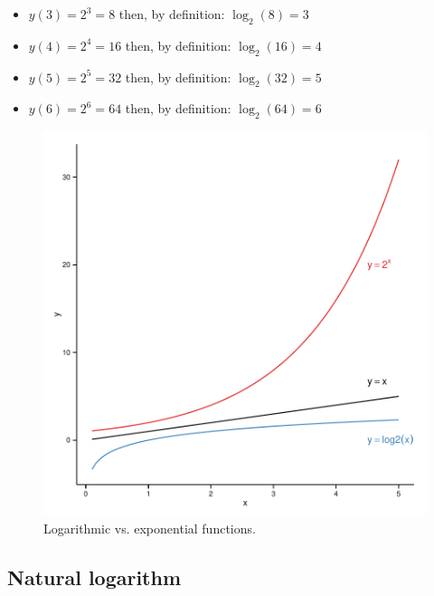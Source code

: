 \begin{itemize}
  \item $y(3) = 2^3 = 8$ \quad then, by definition: \quad $\log_2(8) = 3$
  \item $y(4) = 2^4 = 16$ \quad then, by definition: \quad $\log_2(16) = 4$
  \item $y(5) = 2^5 = 32$ \quad then, by definition: \quad $\log_2(32) = 5$
  \item $y(6) = 2^6 = 64$ \quad then, by definition: \quad $\log_2(64) = 6$
\end{itemize}

\begin{knitrout}
\color{fgcolor}\begin{figure}[]

\includegraphics[width=\linewidth]{images/math-fun_explog} \caption{Logarithmic vs. exponential functions.\label{fig:fun_explog}}
\end{figure}


\end{knitrout}


\subsection{Natural logarithm}

